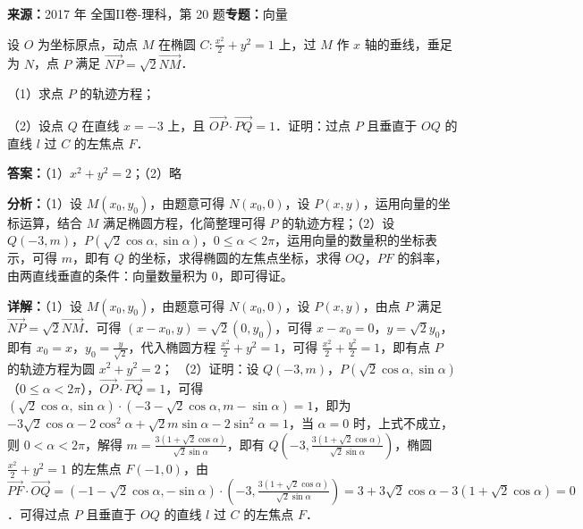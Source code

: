 \begin{question}[points=12]
\textbf{来源：}2017 年 全国II卷-理科，第 20 题\quad \textbf{专题：}向量\par
设 $O$ 为坐标原点，动点 $M$ 在椭圆 $C:\frac{x^2}{2}+y^2=1$ 上，过 $M$ 作 $x$ 轴的垂线，垂足为 $N$，点 $P$ 满足 $\overrightarrow{NP}=\sqrt{2}\overrightarrow{NM}$．

（1）求点 $P$ 的轨迹方程；

（2）设点 $Q$ 在直线 $x=-3$ 上，且 $\overrightarrow{OP}\cdot\overrightarrow{PQ}=1$．证明：过点 $P$ 且垂直于 $OQ$ 的直线 $l$ 过 $C$ 的左焦点 $F$．
\begin{solution}
\textbf{答案：}（1）$x^2+y^2=2$；（2）略

\textbf{分析：}（1）设 $M(x_0,y_0)$，由题意可得 $N(x_0,0)$，设 $P(x,y)$，运用向量的坐标运算，结合 $M$ 满足椭圆方程，化简整理可得 $P$ 的轨迹方程；（2）设 $Q(-3,m)$，$P(\sqrt{2}\cos\alpha,\sin\alpha)$，$0\le\alpha<2\pi$，运用向量的数量积的坐标表示，可得 $m$，即有 $Q$ 的坐标，求得椭圆的左焦点坐标，求得 $OQ$，$PF$ 的斜率，由两直线垂直的条件：向量数量积为 $0$，即可得证。

\textbf{详解：}（1）设 $M(x_0,y_0)$，由题意可得 $N(x_0,0)$，设 $P(x,y)$，由点 $P$ 满足 $\overrightarrow{NP}=\sqrt{2}\overrightarrow{NM}$．可得 $(x-x_0,y)=\sqrt{2}(0,y_0)$，可得 $x-x_0=0$，$y=\sqrt{2}y_0$，即有 $x_0=x$，$y_0=\frac{y}{\sqrt{2}}$，代入椭圆方程 $\frac{x^2}{2}+y^2=1$，可得 $\frac{x^2}{2}+\frac{y^2}{2}=1$，即有点 $P$ 的轨迹方程为圆 $x^2+y^2=2$；
（2）证明：设 $Q(-3,m)$，$P(\sqrt{2}\cos\alpha,\sin\alpha)$（$0\le\alpha<2\pi$），$\overrightarrow{OP}\cdot\overrightarrow{PQ}=1$，可得 $(\sqrt{2}\cos\alpha,\sin\alpha)\cdot(-3-\sqrt{2}\cos\alpha,m-\sin\alpha)=1$，即为 $-3\sqrt{2}\cos\alpha-2\cos^2\alpha+\sqrt{2}m\sin\alpha-2\sin^2\alpha=1$，当 $\alpha=0$ 时，上式不成立，则 $0<\alpha<2\pi$，解得 $m=\frac{3(1+\sqrt{2}\cos\alpha)}{\sqrt{2}\sin\alpha}$，即有 $Q(-3,\frac{3(1+\sqrt{2}\cos\alpha)}{\sqrt{2}\sin\alpha})$，椭圆 $\frac{x^2}{2}+y^2=1$ 的左焦点 $F(-1,0)$，由 $\overrightarrow{PF}\cdot\overrightarrow{OQ}=(-1-\sqrt{2}\cos\alpha,-\sin\alpha)\cdot(-3,\frac{3(1+\sqrt{2}\cos\alpha)}{\sqrt{2}\sin\alpha})=3+3\sqrt{2}\cos\alpha-3(1+\sqrt{2}\cos\alpha)=0$．可得过点 $P$ 且垂直于 $OQ$ 的直线 $l$ 过 $C$ 的左焦点 $F$．
\end{solution}
\end{question}


